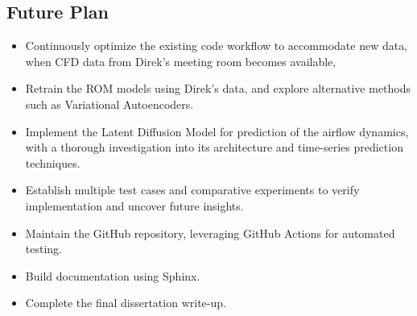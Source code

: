 \documentclass[final-report]{article-template}
\begin{document}
\clearpage

\subsection{Future Plan}
\begin{itemize}
    \item Continuously optimize the existing code workflow to accommodate new data, when CFD data from Direk's meeting room becomes available,
    \item Retrain the ROM models using Direk's data, and explore alternative methods such as Variational Autoencoders.
    \item Implement the Latent Diffusion Model for prediction of the airflow dynamics, with a thorough investigation into its architecture and time-series prediction techniques.
    \item Establish multiple test cases and comparative experiments to verify implementation and uncover future insights.
    \item Maintain the GitHub repository, leveraging GitHub Actions for automated testing.
    \item Build documentation using Sphinx.
    \item Complete the final dissertation write-up.
\end{itemize}
\end{document}
